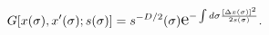 \begin{equation}
   G[x(\sigma),x'(\sigma);s(\sigma)]=s^{-D/2}(\sigma) \text{\Large e}^{-\int
   d\sigma \frac{[\Delta x(\sigma)]^2}{2s(\sigma)}}. \label{299}
   \end{equation}

